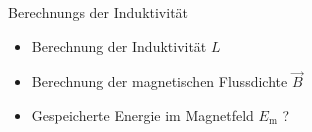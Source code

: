 \begin{frame}

\begin{bsp}{Berechnungs der Induktivität}{}
	\begin{itemize}
	\item Berechnung der Induktivität $L$
	\item Berechnung der magnetischen Flussdichte $\vec{B}$
	\item Gespeicherte Energie im Magnetfeld $E_\mathrm{m}$ ?
	\end{itemize}
\end{bsp}

\end{frame}
